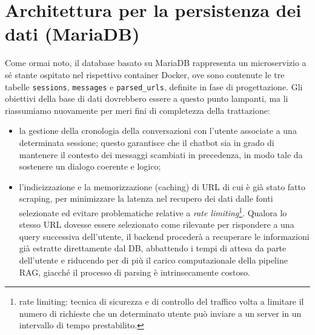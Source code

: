 \section{Architettura per la persistenza dei dati (MariaDB)}
Come ormai noto, il database basato su MariaDB rappresenta un microservizio a sé stante ospitato nel rispettivo container Docker, ove sono contenute le tre tabelle \texttt{sessions}, \texttt{messages} e \texttt{parsed\_urls}, definite in fase di progettazione. Gli obiettivi della base di dati dovrebbero essere a questo punto lampanti, ma li riassumiamo nuovamente per meri fini di completezza della trattazione:
\begin{itemize}
    \item la gestione della cronologia della conversazioni con l'utente associate a una determinata sessione; questo garantisce che il chatbot sia in grado di mantenere il contesto dei messaggi scambiati in precedenza, in modo tale da sostenere un dialogo coerente e logico;
    \item l'indicizzazione e la memorizzazione (caching) di URL di cui è già stato fatto scraping, per minimizzare la latenza nel recupero dei dati dalle fonti selezionate ed evitare problematiche relative a \textit{rate limiting}\footnote{rate limiting: tecnica di sicurezza e di controllo del traffico volta a limitare il numero di richieste che un determinato utente può inviare a un server in un intervallo di tempo prestabilito.}. Qualora lo stesso URL dovesse essere selezionato come rilevante per rispondere a una query successiva dell'utente, il backend procederà a recuperare le informazioni già estratte direttamente dal DB, abbattendo i tempi di attesa da parte dell'utente e riducendo per di più il carico computazionale della pipeline RAG, giacché il processo di parsing è intrinsecamente costoso.   
\end{itemize}

